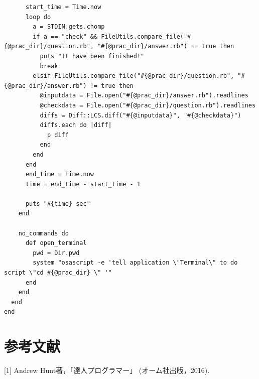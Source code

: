 \documentclass[11pt,dvipdfmx]{jsarticle}
\begin{document}
\begin{verbatim}
      start_time = Time.now
      loop do
        a = STDIN.gets.chomp
        if a == "check" && FileUtils.compare_file("#{@prac_dir}/question.rb", "#{@prac_dir}/answer.rb") == true then
          puts "It have been finished!"
          break
        elsif FileUtils.compare_file("#{@prac_dir}/question.rb", "#{@prac_dir}/answer.rb") != true then
          @inputdata = File.open("#{@prac_dir}/answer.rb").readlines
          @checkdata = File.open("#{@prac_dir}/question.rb").readlines
          diffs = Diff::LCS.diff("#{@inputdata}", "#{@checkdata}")
          diffs.each do |diff|
            p diff
          end
        end
      end
      end_time = Time.now
      time = end_time - start_time - 1
      
      puts "#{time} sec"
    end
    
    no_commands do
      def open_terminal
        pwd = Dir.pwd
        system "osascript -e 'tell application \"Terminal\" to do script \"cd #{@prac_dir} \" '"
      end
    end
  end
end
\end{verbatim}

    \section{参考文献}\label{ux53c2ux8003ux6587ux732e}

{[}1{]} Andrew Hunt著，「達人プログラマー」 (オーム社出版，2016).


    
    
    
    
\end{document}
